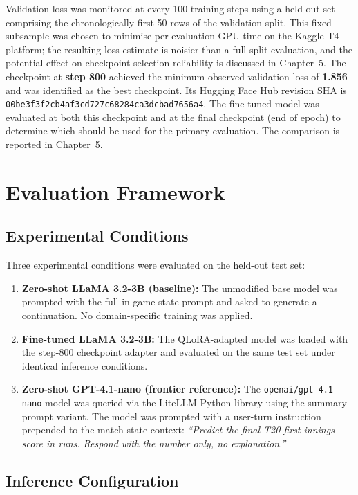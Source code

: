 Validation loss was monitored at every 100 training steps using a held-out set comprising the chronologically first 50 rows of the validation split. This fixed subsample was chosen to minimise per-evaluation GPU time on the Kaggle T4 platform; the resulting loss estimate is noisier than a full-split evaluation, and the potential effect on checkpoint selection reliability is discussed in Chapter~5. The checkpoint at \textbf{step 800} achieved the minimum observed validation loss of \textbf{1.856} and was identified as the best checkpoint. Its Hugging Face Hub revision SHA is \texttt{00be3f3f2cb4af3cd727c68284ca3dcbad7656a4}. The fine-tuned model was evaluated at both this checkpoint and at the final checkpoint (end of epoch) to determine which should be used for the primary evaluation. The comparison is reported in Chapter~5.

\section{Evaluation Framework}

\subsection{Experimental Conditions}

Three experimental conditions were evaluated on the held-out test set:

\begin{enumerate}
    \item \textbf{Zero-shot LLaMA 3.2-3B (baseline):} The unmodified base model was prompted with the full in-game-state prompt and asked to generate a continuation. No domain-specific training was applied.
    \item \textbf{Fine-tuned LLaMA 3.2-3B:} The QLoRA-adapted model was loaded with the step-800 checkpoint adapter and evaluated on the same test set under identical inference conditions.
    \item \textbf{Zero-shot GPT-4.1-nano (frontier reference):} The \texttt{openai/gpt-4.1-nano} model was queried via the LiteLLM Python library \cite{litellm2023} using the summary prompt variant. The model was prompted with a user-turn instruction prepended to the match-state context: \textit{``Predict the final T20 first-innings score in runs. Respond with the number only, no explanation.''}
\end{enumerate}

\subsection{Inference Configuration}

